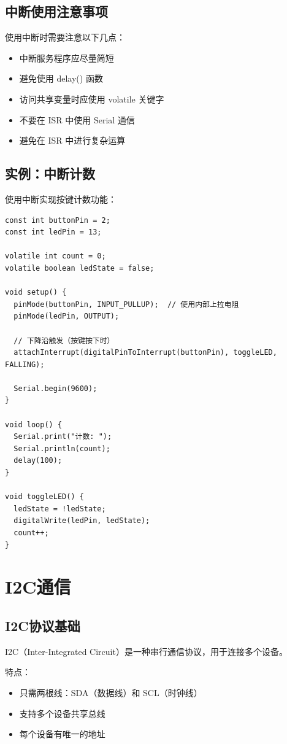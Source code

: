 \documentclass[12pt,UTF8]{ctexbook}
\begin{document}
\section{中断使用注意事项}

使用中断时需要注意以下几点：
\begin{itemize}
    \item 中断服务程序应尽量简短
    \item 避免使用 delay() 函数
    \item 访问共享变量时应使用 volatile 关键字
    \item 不要在 ISR 中使用 Serial 通信
    \item 避免在 ISR 中进行复杂运算
\end{itemize}

\section{实例：中断计数}

使用中断实现按键计数功能：

\begin{lstlisting}
const int buttonPin = 2;
const int ledPin = 13;

volatile int count = 0;
volatile boolean ledState = false;

void setup() {
  pinMode(buttonPin, INPUT_PULLUP);  // 使用内部上拉电阻
  pinMode(ledPin, OUTPUT);
  
  // 下降沿触发（按键按下时）
  attachInterrupt(digitalPinToInterrupt(buttonPin), toggleLED, FALLING);
  
  Serial.begin(9600);
}

void loop() {
  Serial.print("计数: ");
  Serial.println(count);
  delay(100);
}

void toggleLED() {
  ledState = !ledState;
  digitalWrite(ledPin, ledState);
  count++;
}
\end{lstlisting}

\chapter{I2C通信}

\section{I2C协议基础}

I2C（Inter-Integrated Circuit）是一种串行通信协议，用于连接多个设备。

特点：
\begin{itemize}
    \item 只需两根线：SDA（数据线）和 SCL（时钟线）
    \item 支持多个设备共享总线
    \item 每个设备有唯一的地址
\end{itemize}
\end{document}
